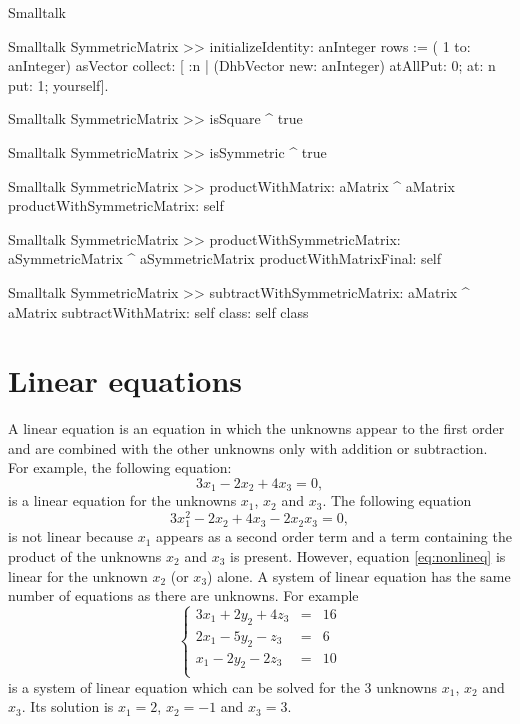 \begin{displaycode}{Smalltalk}
\begin{displaycode}{Smalltalk}
SymmetricMatrix >> initializeIdentity: anInteger
    rows := ( 1 to: anInteger) asVector collect: [ :n | (DhbVector 
                 new: anInteger) atAllPut: 0; at: n put: 1; yourself].
\end{displaycode}

\begin{displaycode}{Smalltalk}
SymmetricMatrix >> isSquare
    ^ true
\end{displaycode}

\begin{displaycode}{Smalltalk}
SymmetricMatrix >> isSymmetric
    ^ true
\end{displaycode}

\begin{displaycode}{Smalltalk}
SymmetricMatrix >> productWithMatrix: aMatrix
    ^ aMatrix productWithSymmetricMatrix: self
\end{displaycode}

\begin{displaycode}{Smalltalk}
SymmetricMatrix >> productWithSymmetricMatrix: aSymmetricMatrix
    ^ aSymmetricMatrix productWithMatrixFinal: self
\end{displaycode}

\begin{displaycode}{Smalltalk}
SymmetricMatrix >> subtractWithSymmetricMatrix: aMatrix
    ^ aMatrix subtractWithMatrix: self class: self class
\end{displaycode}

\section{Linear equations}
\label{sec:lineqs} A linear equation is an equation in which the
unknowns appear to the first order and are combined with the other
unknowns only with addition or subtraction. For example, the
following equation:
\begin{equation}
  3x_1-2x_2+4x_3=0,
\end{equation}
is a linear equation for the unknowns $x_1$, $x_2$ and $x_3$. The
following equation
\begin{equation}
\label{eq:nonlineq}
  3x_1^2-2x_2+4x_3 - 2 x_2 x_3=0,
\end{equation}
is not linear because $x_1$ appears as a second order term and a
term containing the product of the unknowns $x_2$ and $x_3$ is
present. However, equation \ref{eq:nonlineq} is linear for the
unknown $x_2$ (or $x_3$) alone. A system of linear equation has
the same number of equations as there are unknowns. For example
\begin{equation}
\label{eq:lineqex}
  \left\{
  \begin{array}{lcr}
  3x_1+2y_2+4z_3&=&16\\
  2x_1-5y_2-z_3&=&6\\
  x_1-2y_2-2z_3&=&10\\
\end{array}\right.
\end{equation}
is a system of linear equation which can be solved for the 3
unknowns $x_1$, $x_2$ and $x_3$. Its solution is $x_1=2$, $x_2=-1$
and $x_3=3$.


\end{displaycode}
